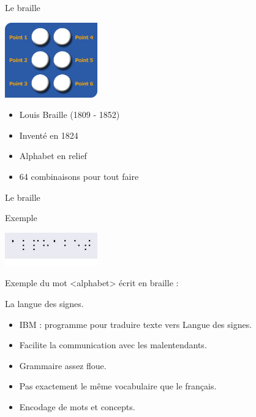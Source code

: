 \documentclass{beamer}
\begin{document}
\begin{frame}  
  { \Huge Le braille }
  \begin{center}
  \includegraphics[width=4cm]{./include/cellule_braille.jpg}
  \end{center}
  \normalsize \begin{itemize}
  \item Louis Braille (1809 - 1852)
  \item Inventé en 1824
  \item Alphabet en relief
  \item 64 combinaisons pour tout faire
  \end{itemize}
\end{frame}

\begin{frame}  
  { \Huge Le braille }
  \begin{block}{Exemple}
  \begin{center}
  \includegraphics[width=4cm]{./include/braille_alphabet.jpg}
  \end{center}
  Exemple du mot <alphabet> écrit en braille :
  \end{block}
\end{frame}


\begin{frame}  
  { \Huge La langue des signes. }
  \begin{itemize}
  \item IBM : programme pour traduire texte vers Langue des signes.
  \item Facilite la communication avec les malentendants.
  \item Grammaire assez floue.
  \item Pas exactement le même vocabulaire que le français.
  \item Encodage de mots et concepts.
  \end{itemize}
\end{frame}
\end{document}
